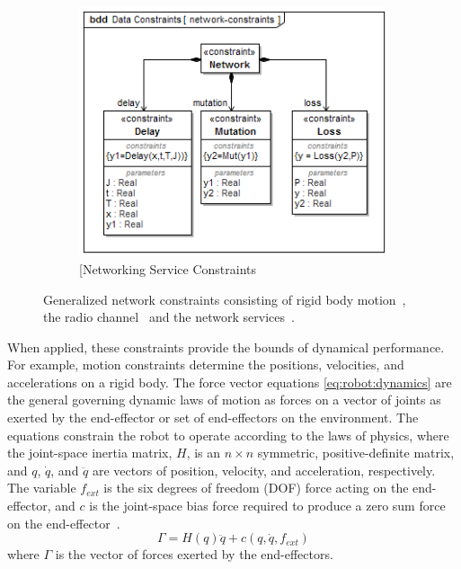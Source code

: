 \begin{figure}[ht]
	\begin{subfigure}{.8\textwidth}
	\centering
	\includegraphics[width=.8\linewidth]{./chapter-sysml/diagrams/bdd__Data_Constraints__network-constraints}  
	\caption{[Networking Service Constraints}
	\label{sysml:fig:constraints:network}
	\end{subfigure}

	\caption{Generalized network constraints consisting of rigid body motion~\protect{}, the radio channel~\protect{} and the network services~\protect{}.}
	\label{sysml:fig:general:constraints}	
	
\end{figure}

When applied, these constraints provide the bounds of dynamical performance.  For example, motion constraints determine the positions, velocities, and accelerations on a rigid body.  The force vector equations \eqref{eq:robot:dynamics} are the general governing dynamic laws of motion as forces on a vector of joints as exerted by the end-effector or set of end-effectors on the environment.  The equations constrain the robot to operate according to the laws of physics, where the joint-space inertia matrix, $H$, is an ${n}\times{n}$ symmetric, positive-definite matrix, and $q$, $\dot{q}$, and $\ddot{q}$ are vectors of position, velocity, and acceleration, respectively.  The variable $f_{ext}$ is the six degrees of freedom (DOF) force acting on the end-effector, and $c$ is the joint-space bias force required to produce a zero sum force on the end-effector~\cite{Featherstone2007}.  
\begin{equation}
\label{eq:robot:dynamics}
\Gamma = H(q) \ddot{q} + c(q,\dot{q},f_{\!ext})
\end{equation}    
where $\Gamma$ is the vector of forces exerted by the end-effectors.  


